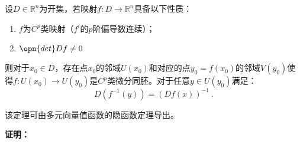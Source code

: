 
\begin{issues}
\issueDraft
\end{issues}
\begin{theorem}{}
设$D\in \mathbb R^n$为开集，若映射$f:D\rightarrow \mathbb R^n$具备以下性质：
\begin{enumerate}
\item $f$为$C^p$类映射（$f^i$的$p$阶偏导数连续）；
\item $\opn{det}Df\neq 0$
\end{enumerate}
则对于$x_0\in D$，存在点$x_0$的邻域$U(x_0)$和对应的点$y_0=f(x_0)$的邻域$V(y_0)$使得$f:U(x_0)\rightarrow U(y_0)$是$C^p$类微分同胚。对于任意$y\in U(y_0)$满足：
\begin{equation}
D(f^{-1}(y))=(Df(x))^{-1}~.
\end{equation}
\end{theorem}
该定理可由多元向量值函数的隐函数定理导出。

\textbf{证明：}
